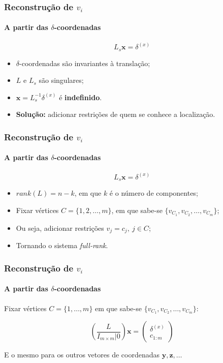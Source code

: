 \begin{frame}
\frametitle{Reconstrução de $v_i$}
\framesubtitle{A partir das $\delta$-coordenadas}

$$L_s \textbf{x} = \delta^{(x)}$$

\begin{itemize}
	\item $\delta$-coordenadas são invariantes à translação;
	\item $L$ e $L_s$ são singulares;
	\item $\textbf{x} = L_s^{-1} \delta^{(x)}$ é \textbf{indefinido}.
	\item \textbf{Solução:} adicionar restrições de quem se conhece a localização.
	
\end{itemize}

\end{frame}


\begin{frame}
\frametitle{Reconstrução de $v_i$}
\framesubtitle{A partir das $\delta$-coordenadas}

$$L_s \textbf{x} = \delta^{(x)}$$

\begin{itemize}
	\item $rank(L) = n - k$, em que $k$ é o número de componentes;
	\item Fixar vértices $C = \{1, 2, \dots, m\}$, em que sabe-se $\{v_{C_1}, v_{C_2}, \dots, v_{C_m}\}$;
	\item Ou seja, adicionar restrições $v_{j} = c_j,\ j \in C$;
	\item Tornando o sistema \textit{full-rank}.
\end{itemize}

\end{frame}


\begin{frame}
\frametitle{Reconstrução de $v_i$}
\framesubtitle{A partir das $\delta$-coordenadas}

Fixar vértices $C = \{1, \dots, m\}$ em que sabe-se $\{v_{C_1}, v_{C_2}, \dots, v_{C_m}\}$:

\bigskip

$$\left(\frac{L}{I_{m\times m} | 0}\right) \textbf{x} = \begin{pmatrix}
	\delta^{(x)} \\
	c_{1:m}
\end{pmatrix}$$

\bigskip
E o mesmo para os outros vetores de coordenadas $\mathbf{y, z, \dots}$
\medskip

\smallskip

\end{frame}


